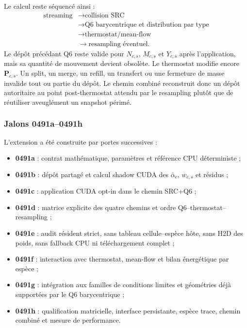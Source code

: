 \documentclass[11pt,a4paper]{article}
\begin{document}
Le calcul reste séquencé ainsi :
\begin{equation}
\begin{aligned}
  \text{streaming}
  &\rightarrow \text{collision SRC}\\
  &\rightarrow \text{Q6 barycentrique et distribution par type}\\
  &\rightarrow \text{thermostat/mean-flow}\\
  &\rightarrow \text{resampling éventuel}.
\end{aligned}
\end{equation}
Le dépôt précédant Q6 reste valide pour $N_{c,s}$, $M_{c,s}$ et $Y_{c,s}$ après l'application, mais sa quantité de mouvement devient obsolète. Le thermostat modifie encore $\bm{P}_{c,s}$. Un split, un merge, un refill, un transfert ou une fermeture de masse invalide tout ou partie du dépôt. Le chemin combiné reconstruit donc un dépôt autoritaire au point post-thermostat attendu par le resampling plutôt que de réutiliser aveuglément un snapshot périmé.

\subsubsection{Jalons 0491a--0491h}

L'extension a été construite par portes successives :
\begin{itemize}[nosep]
  \item \textbf{0491a} : contrat mathématique, paramètres et référence CPU déterministe ;
  \item \textbf{0491b} : dépôt partagé et calcul shadow CUDA des $\bar\alpha_c$, $w_{c,s}$ et résidus ;
  \item \textbf{0491c} : application CUDA opt-in dans le chemin SRC+Q6 ;
  \item \textbf{0491d} : matrice explicite des quatre chemins et ordre Q6--thermostat--resampling ;
  \item \textbf{0491e} : audit résident strict, sans tableau cellule--espèce hôte, sans H2D des poids, sans fallback CPU ni téléchargement complet ;
  \item \textbf{0491f} : interaction avec thermostat, mean-flow et bilan énergétique par espèce ;
  \item \textbf{0491g} : intégration aux familles de conditions limites et géométries déjà supportées par le Q6 barycentrique ;
  \item \textbf{0491h} : qualification matricielle, interface persistante, espèce trace, chemin combiné et mesure de performance.
\end{itemize}
\end{document}
